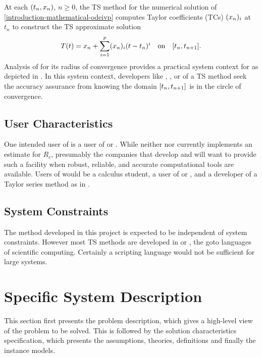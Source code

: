 \documentclass[12pt]{article}
\begin{document}
At each $( {t_n,x_n} )$, $n \geq 0$, the TS method for the numerical solution
of \eqref{introduction-mathematical-odeivp} computes Taylor coefficients (TCs)
$(x_{n})_{i}$ at $t_{n}$ to construct the TS approximate solution
\begin{align}
  \label{eq:tss}
  \Tp(t) = \xn + \sum_{i=1}^{p}\tc{\xn}{i}(t-\tn)^{i} \quad\mbox{on}\quad \lode.
\end{align}
Analysis of  for its radius of convergence provides a practical system
context for  as depicted in .
In this system context, developers like \cite{bergsma2016application},
\cite{jorba2005software}, or \cite{chang1982} of a TS method seek the accuracy
assurance from knowing the domain $\lode$ is in the circle of convergence.

\subsection{User Characteristics} \label{SecUserCharacteristics}
\label{sc:SecUserCharacteristics}

One intended user of  is a user of \maple or \matlab. While
neither \matlab nor \maple currently implements an estimate for $R_c$,
presumably the companies that develop \matlab and \maple will want
to provide such a facility when robust, reliable, and accurate computational
tools are available.
Users of  would be a calculus student, a user of \maple or \matlab, and a
developer of a Taylor series method as in .

\subsection{System Constraints}

The method developed in this project is expected to be independent of system constraints. However
most TS methods are developed in \cpp or \fortran, the goto languages of scientific computing.
Certainly a scripting language would not be sufficient for large systems.

\section{Specific System Description} \label{sc:specific-system-description}

This section first presents the problem description, which gives a high-level
view of the problem to be solved.  This is followed by the solution characteristics
specification, which presents the assumptions, theories, definitions and finally
the instance models.
\end{document}
